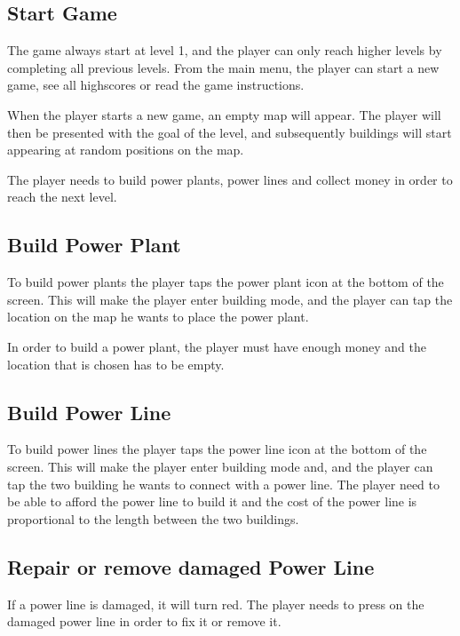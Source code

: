 \subsection*{Start Game}

	The game always start at level 1, and the player can only reach higher levels by completing 
	all previous levels. From the main menu, the player can start a new game, see all highscores 
	or read the game instructions. 

	When the player starts a new game, an empty map will appear. The player will then be 
	presented with the goal of the level, and subsequently buildings will start appearing 
	at random positions on the map.

	The player needs to build power plants, power lines and collect money in order
	to reach the next level.

\subsection*{Build Power Plant}

	To build power plants the player taps the power plant icon at the bottom of the screen. 
	This will make the player enter building mode, and the player can tap the location on the 
	map he wants to place the power plant. 

	In order to build a power plant, the player must have enough money and the
	location that is chosen has to be empty.

\subsection*{Build Power Line}

	To build power lines the player taps the power line icon at the bottom of the screen. 
	This will make the player enter building mode and, and the player can tap the two 
	building he wants to connect with a power line. The player need to be able to afford 
	the power line to build it and the cost of the power line is proportional to the length 
	between the two buildings.

\subsection*{Repair or remove damaged Power Line}

	If a power line is damaged, it will turn red. The player needs to press on the
	damaged power line in order to fix it or remove it. 

